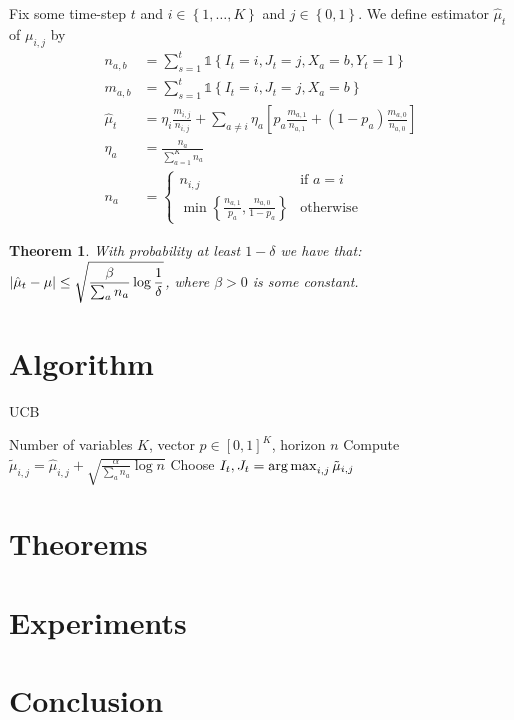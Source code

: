 \documentclass{article}
\newcommand{\set}[1]{\left\{#1\right\}}
\newcommand{\ind}[1]{\mathds{1}\!\!\set{#1}}
\newcommand{\argmax}{\operatornamewithlimits{arg\,max}}
\newcommand{\eq}[1]{\begin{align*}#1\end{align*}}
\theoremstyle{plain}
\newtheorem{theorem}{Theorem}
\theoremstyle{definition}
\begin{document}
Fix some time-step $t$ and $i \in \set{1,\ldots,K}$ and $j \in \set{0,1}$.
We define estimator $\hat \mu_t$ of $\mu_{i,j}$ by
\eq{
n_{a,b}    &= \sum_{s=1}^t \ind{I_t = i, J_t = j, X_a = b, Y_t = 1} \\
m_{a,b}    &= \sum_{s=1}^t \ind{I_t = i, J_t = j, X_a = b} \\
\hat \mu_t &= \eta_i \frac{m_{i,j}}{n_{i,j}}  + \sum_{a \neq i} \eta_a \left[p_a \frac{m_{a,1}}{n_{a,1}} + (1 - p_a) \frac{m_{a,0}}{n_{a,0}}\right] \\
\eta_a     &= \frac{n_a}{\sum_{a=1}^K n_a} \\
n_a        &= \begin{cases} 
  n_{i,j}                                           & \text{if } a = i \\
  \min\set{\frac{n_{a,1}}{p_a}, \frac{n_{a,0}}{1-p_a}}  & \text{otherwise}
\end{cases}
}
\begin{theorem} With probability at least $1 - \delta$ we have that:
$\displaystyle \left|\hat \mu_t - \mu\right| \leq \sqrt{\frac{\beta}{\sum_{a} n_a} \log{1 \over \delta}}$,
where $\beta > 0$ is some constant.
\end{theorem}

\section{Algorithm}

\begin{algorithm}
\caption{UCB}
\begin{algorithmic}[1]
 Number of variables $K$, vector $p \in [0,1]^K$, horizon $n$
\For{$j \in \set{0,1}$}
\State Compute $\tilde \mu_{i,j} = \hat \mu_{i,j} + \sqrt{\frac{\alpha}{\sum_{a} n_a} \log n}$ 
\EndFor
\EndFor
\State Choose $I_t, J_t = \argmax_{i,j} \tilde \mu_{i,j}$
\EndFor
\end{algorithmic}
\end{algorithm}

\section{Theorems}
\section{Experiments}
\section{Conclusion}



\end{document}
